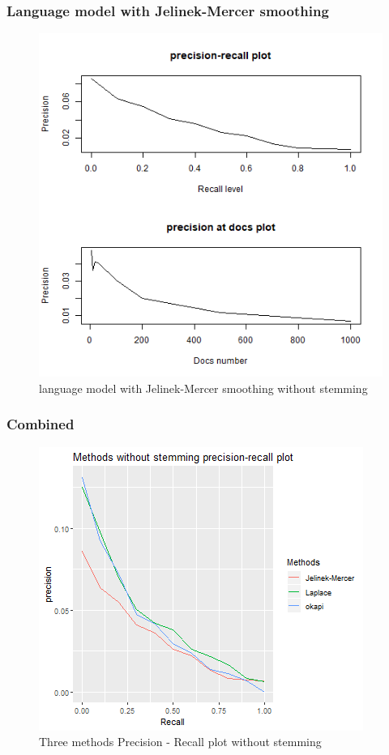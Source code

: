 \documentclass[a4pper,11pt,onecolumn]{article}
\begin{document}
\subsubsection{Language model with Jelinek-Mercer smoothing}

    \begin{figure}[H]
    \caption{language model with Jelinek-Mercer smoothing without stemming}
    \includegraphics[scale = 0.6]{model6.png}
    \centering
    \end{figure}

\subsubsection{Combined}

    \begin{figure}[H]
    \caption{Three methods Precision - Recall plot without stemming}
    \includegraphics[scale = 0.6]{no_stemming_pr.png}
    \centering
    \end{figure}
\end{document}
